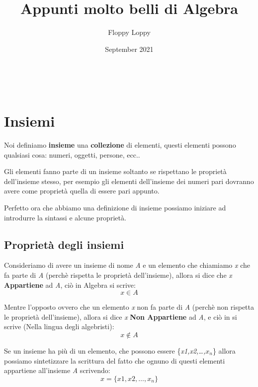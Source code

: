 \documentclass{article}
\begin{document}
\title{Appunti molto belli di Algebra}
\author{Floppy Loppy}
\date{September 2021}
\maketitle
\tableofcontents
\newpage
\listoftodos\






\newpage
\section{Insiemi}
Noi definiamo \textbf{insieme} una \textbf{collezione} di elementi, questi elementi possono qualsiasi cosa: numeri, oggetti, persone, ecc.. \par
Gli elementi fanno parte di un insieme soltanto se rispettano le proprietà dell'insieme stesso, per esempio gli elementi dell'insieme dei numeri pari dovranno avere come proprietà quella di essere pari appunto. \par
Perfetto ora che abbiamo una definizione di insieme possiamo iniziare ad introdurre la sintassi e alcune proprietà.


\subsection{Proprietà degli insiemi}
Consideriamo di avere un insieme di nome \textit{A} e un elemento che chiamiamo \textit{x} che fa parte di \textit{A} (perchè rispetta le proprietà dell'insieme), allora si dice che \textit{x} \textbf{Appartiene} ad \textit{A}, ciò in Algebra si scrive:
\begin{equation}
        x \in A
\end{equation}

Mentre l'opposto ovvero che un elemento \textit{x} non fa parte di \textit{A} (perchè non rispetta le proprietà dell'insieme), allora si dice \textit{x} \textbf{Non Appartiene} ad \textit{A}, e ciò in si scrive (Nella lingua degli algebristi):
\begin{equation}
        x \not \in A
\end{equation}

Se un insieme ha più di un elemento, che possono essere \{\textit{x1,x2,\ldots,$x_n$}\} allora possiamo sintetizzare la scrittura del fatto che ognuno di questi elementi appartiene all'insieme \textit{A} scrivendo:
\begin{equation}
        x = \{x1,x2,\ldots,x_n\} 
\end{equation}
\end{document}
